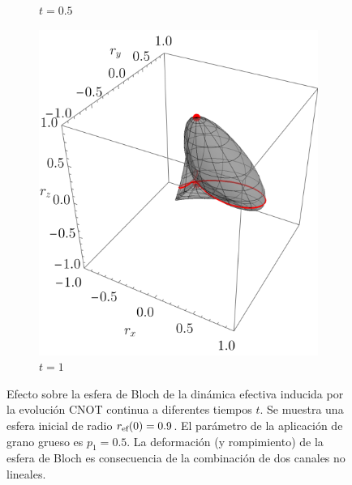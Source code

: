 \begin{figure}[ht!]
\begin{subfigure}{0.32\textwidth}
        \caption{$t=0.5$}
      \end{subfigure}
      \begin{subfigure}{0.32\textwidth}
        \centering
        \includegraphics[width=0.9\linewidth]{chapter3/figures_toy/CNOT_p=0.5_t=1._r=0.9.png}
        \caption{$t=1$}
      \end{subfigure}
      \caption{Efecto sobre la esfera de Bloch de la dinámica efectiva inducida por la evolución CNOT continua a diferentes tiempos $t$. Se muestra una esfera inicial de radio $r_{\text{ef}}(0)=0.9$. El parámetro de la aplicación de grano grueso es $p_{1}=0.5$. La deformación (y rompimiento) de la esfera de Bloch es consecuencia de la combinación de dos canales no lineales. \label{fig:CNOTSequence}}
      \end{figure}
      \newpage




      